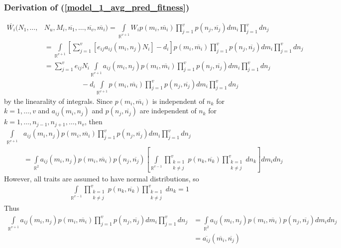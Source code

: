\documentclass{amsart}
\theoremstyle{definition}
\theoremstyle{remark}
\numberwithin{equation}{section}
\begin{document}
\subsubsection{Derivation of (\ref{model_1_avg_pred_fitness})}
\begin{align*}
	\overline{W_i}(N_1, \dots, &N_u, M_i, \overline{n_1}, \dots, \overline{n_v}, \overline{m_i}) = \int\limits_{\mathbb{R}^{v+1}}^{}W_ip(m_i, \overline{m_i})\prod\limits_{j = 1}^{v}p(n_j, \overline{n_j})dm_i\prod\limits_{j = 1}^{v}dn_j \\
	&= \int\limits_{\mathbb{R}^{v+1}}^{}\left[\sum\limits_{j = 1}^{v}\left[e_{ij}a_{ij}(m_i, n_j)N_i\right] - d_i\right]p(m_i, \overline{m_i})\prod\limits_{j = 1}^{v}p(n_j, \overline{n_j})dm_i\prod\limits_{j = 1}^{v}dn_j \\
	&= \sum_{j=1}^{v}e_{ij}N_i\int\limits_{\mathbb{R}^{v+1}}^{}a_{ij}(m_i, n_j)p(m_i, \overline{m_i})\prod\limits_{j = 1}^{v}p(n_j, \overline{n_j})dm_i\prod\limits_{j = 1}^{v}dn_j \\
	&\ \ \ \ \ \ \ \ \ \ \ \ \ \ \ \ \ \ \ \ \ \ \ \ - d_i\int\limits_{\mathbb{R}^{v+1}}p(m_i, \overline{m_i})\prod\limits_{j = 1}^{v}p(n_j, \overline{n_j})dm_i\prod\limits_{j = 1}^{v}dn_j
\end{align*}
by the linearality of integrals.  Since $p(m_i, \overline{m_i})$ is independent of $n_k$ for $k = 1, \dots, v$ and $a_{ij}(m_i, n_j)$ and $p(n_j, \overline{n_j})$ are independent of $n_k$ for $k = 1, \dots, n_{j-1}, n_{j+1}, \dots, n_v$, then
\begin{align*}
	\int\limits_{\mathbb{R}^{v+1}}^{}&a_{ij}(m_i, n_j)p(m_i, \overline{m_i})\prod\limits_{j = 1}^{v}p(n_j, \overline{n_j})dm_i\prod\limits_{j = 1}^{v}dn_j \\
	&= \int\limits_{\mathbb{R}^2}a_{ij}(m_i, n_j)p(m_i, \overline{m_i})p(n_j, \overline{n_j})\left[\int\limits_{\mathbb{R}^{v-1}}\prod\limits_{\substack{k=1\\k\neq j}}^{v}p(n_k, \overline{n_k})\prod\limits_{\substack{k=1\\k\neq j}}^{v}dn_k\right]dm_idn_j
\end{align*}
However, all traits are assumed to have normal distributions, so
\begin{align*}
	\int\limits_{\mathbb{R}^{v-1}}\prod\limits_{\substack{k=1\\k\neq j}}^{v}p(n_k, \overline{n_k})\prod\limits_{\substack{k=1\\k\neq j}}^{v}dn_k = 1
\end{align*}
Thus
\begin{align*}
	\int\limits_{\mathbb{R}^{v+1}}^{}a_{ij}(m_i, n_j)p(m_i, \overline{m_i})\prod\limits_{j = 1}^{v}p(n_j, \overline{n_j})dm_i\prod\limits_{j = 1}^{v}dn_j &= \int\limits_{\mathbb{R}^2}a_{ij}(m_i, n_j)p(m_i, \overline{m_i})p(n_j, \overline{n_j})dm_idn_j \\
	&= \overline{a_{ij}}(\overline{m_i}, \overline{n_j})
\end{align*}
\end{document}
